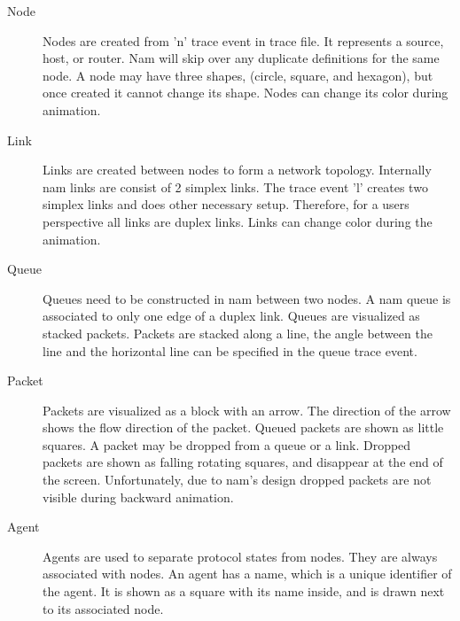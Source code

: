 \begin{description}
\item[Node]
Nodes are created from 'n' trace event in trace file. It represents a source, host, or router. Nam will skip over any duplicate definitions for the same node. A node may have three shapes, (circle, square, and hexagon), but once created it cannot change its shape. Nodes can change its color during animation.

\item[Link]
Links are created between nodes to form a network topology. Internally nam links are consist of 2 simplex links. The trace event 'l' creates two simplex links and does other necessary setup. Therefore, for a users perspective all links are duplex links.  Links can change color during the animation.

\item[Queue]
Queues need to be constructed in nam between two nodes. A nam queue is associated to only one edge of a duplex link. Queues are visualized as stacked packets.  Packets are stacked along a line, the angle between the line and the horizontal line can be specified in the queue trace event.

\item[Packet]
Packets are visualized as a block with an arrow. The direction of the arrow shows the flow direction of the packet. Queued packets are shown as little squares. A packet may be dropped from a queue or a link. Dropped packets are shown as falling rotating squares, and disappear at the end of the screen.  Unfortunately, due to nam's design dropped packets are not visible during backward animation.

\item[Agent]
Agents are used to separate protocol states from nodes. They are always associated with nodes. An agent has a name, which is a unique identifier of the agent. It is shown as a square with its name inside, and is drawn next to its associated node.
\end{description}
